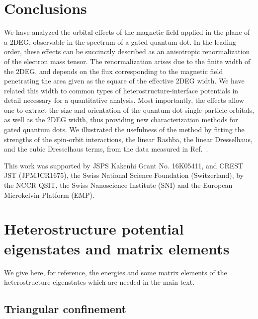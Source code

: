 \documentclass[aps,floatfix,twocolumn,showpacs,10pt,nofootinbib]{revtex4-1}
\begin{document}
\section{Conclusions}

We have analyzed the orbital effects of the magnetic field applied in the plane of a 2DEG, observable in the spectrum of a gated quantum dot. In the leading order, these effects can be succinctly described as an anisotropic renormalization of the electron mass tensor. The renormalization arises due to the finite width of the 2DEG, and depends on the flux corresponding to the magnetic field penetrating the area given as the square of the  effective 2DEG width. We have related this width to common types of heterostructure-interface potentials in detail necessary for a quantitative analysis. Most importantly, the effects allow one to extract the size and orientation of the quantum dot single-particle orbitals, as well as the 2DEG width, thus providing new  characterization methods for gated quantum dots. We illustrated the usefulness of the method by fitting the strengths of the spin-orbit interactions, the linear Rashba, the linear Dresselhaus, and the cubic Dresselhaus terms, from the data measured in Ref.~.

\acknowledgments
This work was supported by JSPS Kakenhi Grant No. 16K05411, and CREST JST (JPMJCR1675),
the Swiss National Science Foundation (Switzerland), by the NCCR QSIT, the Swiss Nanoscience Institute (SNI) and the European Microkelvin Platform (EMP).

\appendix

\section{Heterostructure potential eigenstates and matrix elements}

We give here, for reference, the energies and some matrix elements of the heterostructure eigenstates which are needed in the main text.

\label{app:matele}

\subsection{Triangular confinement}
\end{document}
